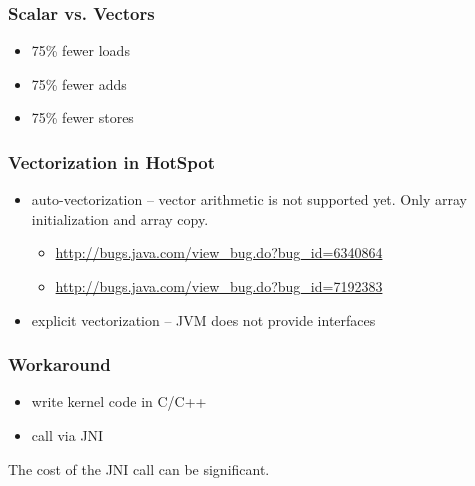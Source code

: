 \documentclass{beamer}
\begin{document}
  	\begin{frame}
    		\frametitle{Scalar vs. Vectors}
    		\begin{itemize}
    			\item 75\% fewer loads
    		    	\item 75\% fewer adds
    		    	\item 75\% fewer stores
		\end{itemize}
  	\end{frame}  	
  	\begin{frame}
  		\frametitle{Vectorization in HotSpot}
		\begin{itemize}
		\item auto-vectorization -- vector arithmetic is not supported yet. Only array initialization and array copy.
  		\begin{itemize}
  			\item \url{http://bugs.java.com/view_bug.do?bug_id=6340864}
  			\item \url{http://bugs.java.com/view_bug.do?bug_id=7192383}
  		\end{itemize}
  		\item explicit vectorization -- JVM does not provide interfaces
		\end{itemize}
  	\end{frame}
  	\begin{frame}
  	  	\frametitle{Workaround}
  	  	\begin{itemize}
  	  	\item write kernel code in C/C++
  	  	\item call via JNI
  	  	\end{itemize}
  	  	\pause
  	  	\vskip15pt 
  	  	The cost of the JNI call can be significant.
  	\end{frame}
\end{document}
